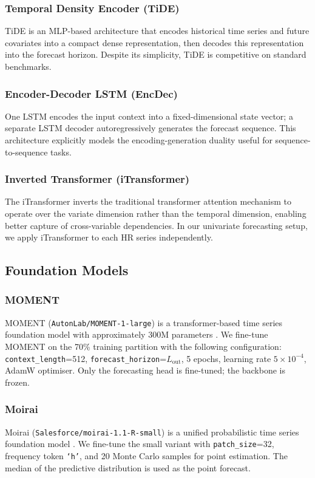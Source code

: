 \documentclass[11pt,a4paper]{article}
\begin{document}
\subsubsection{Temporal Density Encoder (TiDE)}
TiDE \cite{das2024tide} is an MLP-based architecture that encodes historical
time series and future covariates into a compact dense representation, then
decodes this representation into the forecast horizon.  Despite its simplicity,
TiDE is competitive on standard benchmarks.

\subsubsection{Encoder-Decoder LSTM (EncDec)}
One LSTM encodes the input context into a fixed-dimensional state vector; a
separate LSTM decoder autoregressively generates the forecast sequence.  This
architecture explicitly models the encoding-generation duality useful for
sequence-to-sequence tasks.

\subsubsection{Inverted Transformer (iTransformer)}
The iTransformer \cite{liu2024itransformer} inverts the traditional transformer
attention mechanism to operate over the variate dimension rather than the
temporal dimension, enabling better capture of cross-variable dependencies.  In
our univariate forecasting setup, we apply iTransformer to each HR series
independently.

\subsection{Foundation Models}

\subsubsection{MOMENT}
MOMENT (\texttt{AutonLab/MOMENT-1-large}) is a transformer-based time series
foundation model with approximately 300M parameters \cite{goswami2024moment}.
We fine-tune MOMENT on the 70\% training partition with the following
configuration: \texttt{context\_length}=512, \texttt{forecast\_horizon}=$L_{\mathrm{out}}$,
5 epochs, learning rate $5\times10^{-4}$, AdamW optimiser.  Only the
forecasting head is fine-tuned; the backbone is frozen.

\subsubsection{Moirai}
Moirai (\texttt{Salesforce/moirai-1.1-R-small}) is a unified probabilistic
time series foundation model \cite{woo2024moirai}.  We fine-tune the small
variant with \texttt{patch\_size}=32, frequency token \texttt{`h'}, and 20
Monte Carlo samples for point estimation.  The median of the predictive
distribution is used as the point forecast.
\end{document}
